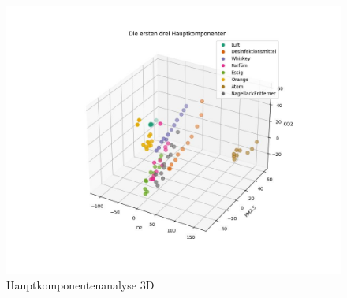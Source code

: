 \documentclass[10pt]{article}
\begin{document}
\begin{figure}[H]
\centering
\includegraphics[scale=0.5]{Bilder/Wichtigkeit der Sensoren 3D.jpeg}
\caption{Hauptkomponentenanalyse 3D}
\end{figure} 
\end{document}
